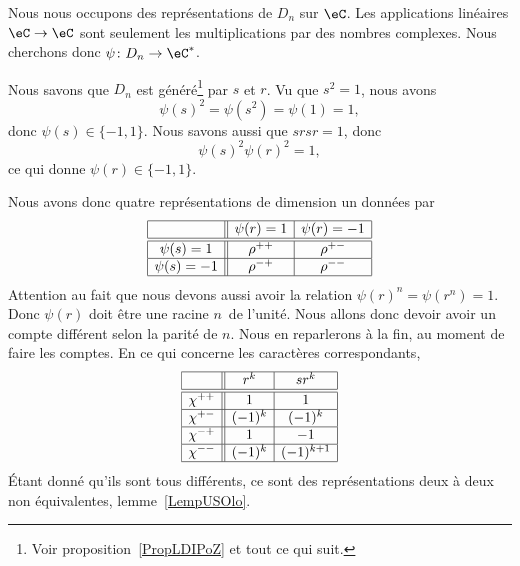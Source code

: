 Nous nous occupons des représentations de \( D_n\) sur \( \eC\). Les applications linéaires \( \eC\to \eC\) sont seulement les multiplications par des nombres complexes. Nous cherchons donc \( \psi\colon D_n\to \eC^*\).

Nous savons que \( D_n\) est généré\footnote{Voir proposition~\ref{PropLDIPoZ} et tout ce qui suit.} par \( s\) et \( r\). Vu que \( s^2=1\), nous avons
\begin{equation}
	\psi(s)^2=\psi(s^2)=\psi(1)=1,
\end{equation}
donc \( \psi(s)\in\{ -1,1 \}\). Nous savons aussi que \( srsr=1\), donc
\begin{equation}
	\psi(s)^2\psi(r)^2=1,
\end{equation}
ce qui donne \( \psi(r)\in\{ -1,1 \}\).

Nous avons donc quatre représentations de dimension un données par
\begin{equation*}
	\begin{array}[]{|c||c|c|}
		\hline
		           & \psi(r)=1 & \psi(r)=-1 \\
		\hline\hline
		\psi(s)=1  & \rho^{++} & \rho^{+-}  \\
		\hline
		\psi(s)=-1 & \rho^{-+} & \rho^{--}  \\
		\hline
	\end{array}
\end{equation*}
Attention au fait que nous devons aussi avoir la relation \( \psi(r)^n=\psi(r^n)=1\). Donc \( \psi(r)\) doit être une racine \( n\)\ieme\ de l'unité. Nous allons donc devoir avoir un compte différent selon la parité de \( n\). Nous en reparlerons à la fin, au moment de faire les comptes. En ce qui concerne les caractères correspondants,
\begin{equation*}
	\begin{array}[]{|c||c|c|}
		\hline
		          & r^k    & sr^k       \\
		\hline\hline
		\chi^{++} & 1      & 1          \\
		\hline
		\chi^{+-} & (-1)^k & (-1)^k     \\
		\hline
		\chi^{-+} & 1      & -1         \\
		\hline
		\chi^{--} & (-1)^k & (-1)^{k+1} \\
		\hline
	\end{array}
\end{equation*}
Étant donné qu'ils sont tous différents, ce sont des représentations deux à deux non équivalentes, lemme~\ref{LempUSOlo}.

